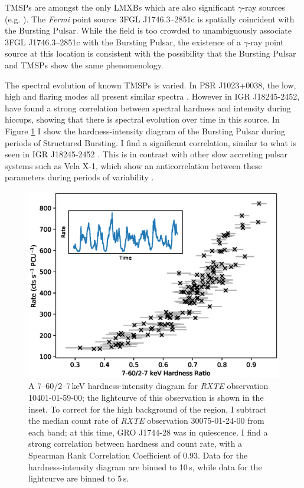 \par TMSPs are amongst the only LMXBs which are also significant $\gamma$-ray sources (e.g. \citealp{Hill_XSS}). The \textit{Fermi} point source 3FGL J1746.3--2851c is spatially coincident with the Bursting Pulsar. While the field is too crowded to unambiguously associate 3FGL J1746.3--2851c with the Bursting Pulsar, the existence of a $\gamma$-ray point source at this location is consistent with the possibility that the Bursting Pulsar and TMSPs show the same phenomenology.

\par The spectral evolution of known TMSPs is varied. In PSR J1023+0038, the low, high and flaring modes all present similar spectra \citep{Bogdanov_TMSPVar}. However in IGR J18245-2452, \citealp{Ferrigno_TMSPVar} have found a strong correlation between spectral hardness and intensity during hiccups, showing that there is spectral evolution over time in this source. In Figure \ref{fig:HR} I show the hardness-intensity diagram of the Bursting Pulsar during periods of Structured Bursting. I find a significant correlation, similar to what is seen in IGR J18245-2452 \citep{Ferrigno_TMSPVar}. This is in contrast with other slow accreting pulsar systems such as Vela X-1, which show an anticorrelation between these parameters during periods of variability \citep{Kreykenbohm_Vela}.

\begin{figure}
 \centering
 \includegraphics[width=.82\linewidth, trim={0.6cm 0.1cm 1.0cm 1.1cm},clip]{images/hr.eps}
 \caption[A 7--60/2--7\,keV hardness-intensity diagram for \textit{RXTE} observation 10401-01-59-00 of the Bursting Pulsar.]{A 7--60/2--7\,keV hardness-intensity diagram for \textit{RXTE} observation 10401-01-59-00; the lightcurve of this observation is shown in the inset. To correct for the high background of the region, I subtract the median count rate of \textit{RXTE} observation 30075-01-24-00 from each band; at this time, GRO J1744-28 was in quiescence. I find a strong correlation between hardness and count rate, with a Spearman Rank Correlation Coefficient of 0.93. Data for the hardness-intensity diagram are binned to 10\,s, while data for the lightcurve are binned to 5\,s.}
 \label{fig:HR}
\end{figure}

